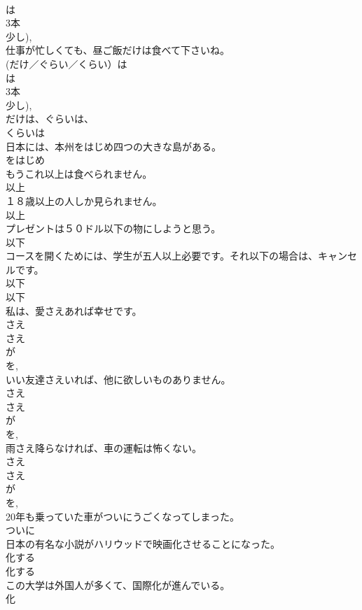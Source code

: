 \documentclass[8pt]{extreport}
\begin{document}
\begin{CJK}{UTF8}{min}
{\\	は 
\\	3本 
\\	少し), 
\\	仕事が忙しくても、昼ご飯だけは食べて下さいね。	
\\	(だけ／ぐらい／くらい）は 
\\	は 
\\	3本 
\\	少し), 
\\	だけは、ぐらいは、
\\	くらいは 
\\	日本には、本州をはじめ四つの大きな島がある。	
\\	をはじめ 
\\	もうこれ以上は食べられません。	
\\	以上 
\\	１８歳以上の人しか見られません。	
\\	以上 
\\	プレゼントは５０ドル以下の物にしようと思う。	
\\	以下 
\\	コースを開くためには、学生が五人以上必要です。それ以下の場合は、キャンセルです。	
\\	以下 
\\	以下 
\\	私は、愛さえあれば幸せです。	
\\	さえ 
\\	さえ 
\\	が 
\\	を, 
\\	いい友達さえいれば、他に欲しいものありません。	
\\	さえ 
\\	さえ 
\\	が 
\\	を, 
\\	雨さえ降らなければ、車の運転は怖くない。	
\\	さえ 
\\	さえ 
\\	が 
\\	を, 
\\	20年も乗っていた車がついにうごくなってしまった。	
\\	ついに 
\\	日本の有名な小説がハリウッドで映画化させることになった。	
\\	化する 
\\	化する 
\\	この大学は外国人が多くて、国際化が進んでいる。	
\\	化 
}
\end{CJK}
\end{document}
